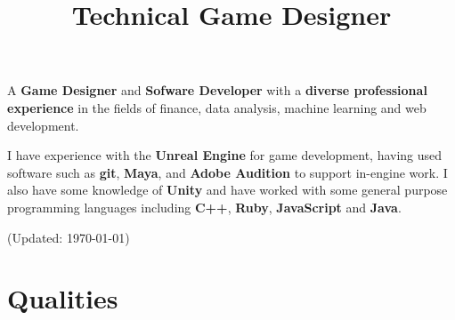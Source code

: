 \documentclass[12pt,a4paper]{moderncv}
\title{Technical Game Designer}               %
\begin{document}
\maketitle

A \textbf{Game Designer} and \textbf{Sofware Developer} with a \textbf{diverse professional experience} in the fields of finance, data analysis, machine learning and web development. 

I have experience with the \textbf{Unreal Engine} for game development, having used software such as \textbf{git}, \textbf{Maya}, and \textbf{Adobe Audition} to support in-engine work. I also have some knowledge of \textbf{Unity} and have worked with some general purpose programming languages including \textbf{C++}, \textbf{Ruby}, \textbf{JavaScript} and \textbf{Java}.

(Updated: \today)

\section{Qualities}
\end{document}
